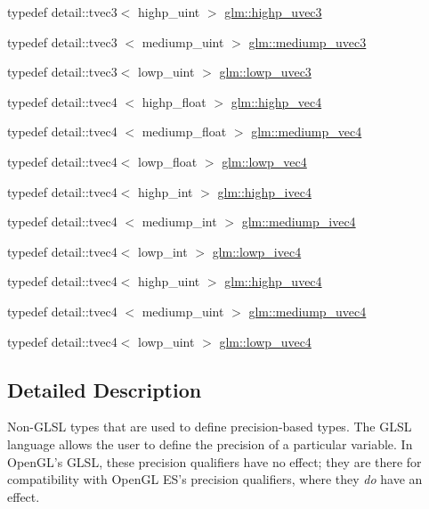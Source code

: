 \begin{DoxyCompactItemize}
\item 
typedef detail\-::tvec3$<$ highp\-\_\-uint $>$ \hyperlink{group__core__precision_gade4b43d968dd42ee3215a51de7b86425}{glm\-::highp\-\_\-uvec3}
\item 
typedef detail\-::tvec3\*
$<$ mediump\-\_\-uint $>$ \hyperlink{group__core__precision_gaa69cb8ff23d5c3daa3cf320136ac8e7d}{glm\-::mediump\-\_\-uvec3}
\item 
typedef detail\-::tvec3$<$ lowp\-\_\-uint $>$ \hyperlink{group__core__precision_ga45a3d9b09e9077ea280d8a1d599c7cae}{glm\-::lowp\-\_\-uvec3}
\item 
typedef detail\-::tvec4\*
$<$ highp\-\_\-float $>$ \hyperlink{group__core__precision_ga78dab0bca921cd9a1e1206ee3cf01207}{glm\-::highp\-\_\-vec4}
\item 
typedef detail\-::tvec4\*
$<$ mediump\-\_\-float $>$ \hyperlink{group__core__precision_ga592096fcf2ef1662f2c0dbbc7754e80c}{glm\-::mediump\-\_\-vec4}
\item 
typedef detail\-::tvec4$<$ lowp\-\_\-float $>$ \hyperlink{group__core__precision_gabc7a12b5fe2a8b5b4d11961c284637dc}{glm\-::lowp\-\_\-vec4}
\item 
typedef detail\-::tvec4$<$ highp\-\_\-int $>$ \hyperlink{group__core__precision_ga69b5a957eb1f6a1201cd7eb9a6ac04c5}{glm\-::highp\-\_\-ivec4}
\item 
typedef detail\-::tvec4\*
$<$ mediump\-\_\-int $>$ \hyperlink{group__core__precision_gaabd2534479a6e7e493a7362b9f4c63cd}{glm\-::mediump\-\_\-ivec4}
\item 
typedef detail\-::tvec4$<$ lowp\-\_\-int $>$ \hyperlink{group__core__precision_gaf6a3d7f4b43a36e905511bc0753e3158}{glm\-::lowp\-\_\-ivec4}
\item 
typedef detail\-::tvec4$<$ highp\-\_\-uint $>$ \hyperlink{group__core__precision_gadc25684638be5d1caeb63d3d5e55feec}{glm\-::highp\-\_\-uvec4}
\item 
typedef detail\-::tvec4\*
$<$ mediump\-\_\-uint $>$ \hyperlink{group__core__precision_ga50b1bc4e07de623f15ec5a319c85609f}{glm\-::mediump\-\_\-uvec4}
\item 
typedef detail\-::tvec4$<$ lowp\-\_\-uint $>$ \hyperlink{group__core__precision_gae312816bc8b9b803de46b9fb2da036eb}{glm\-::lowp\-\_\-uvec4}
\end{DoxyCompactItemize}


\subsection{\-Detailed \-Description}
\-Non-\/\-G\-L\-S\-L types that are used to define precision-\/based types. \-The \-G\-L\-S\-L language allows the user to define the precision of a particular variable. \-In \-Open\-G\-L's \-G\-L\-S\-L, these precision qualifiers have no effect; they are there for compatibility with \-Open\-G\-L \-E\-S's precision qualifiers, where they {\itshape do\/} have an effect.

